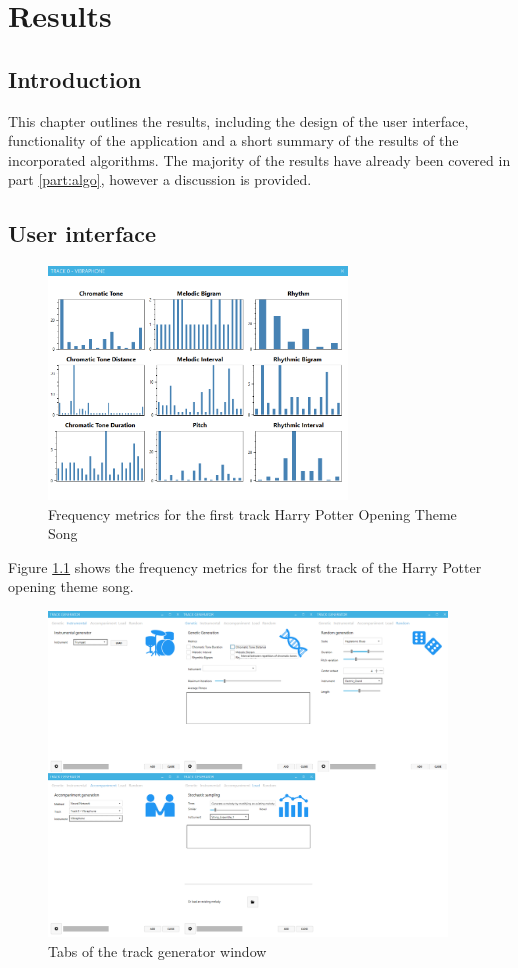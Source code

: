 

\chapter{Results}

\section{Introduction}
This chapter outlines the results, including the design of the user interface, functionality of the application and a short summary of the results of the incorporated algorithms.
The majority of the results have already been covered in part \ref{part:algo}, however a discussion is provided.

\section{User interface}

\begin{figure}
\centerline{\includegraphics[width=300px]{../images/res_ui_metrics_harry_t0.png}}
\caption{Frequency metrics for the first track Harry Potter Opening Theme Song}
\label{ims:metricsharryt0}
\end{figure}

Figure \ref{ims:metricsharryt0} shows the frequency metrics for the first track of the Harry Potter opening theme song.

\begin{figure}
\centerline{\includegraphics[width=400px]{../images/ui_trackgen_alltabs.png}}
\caption{Tabs of the track generator window}
\label{ims:uitrackgenalltabs}
\end{figure}

